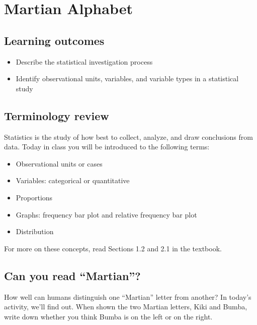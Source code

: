 \documentclass[
]{report}
\begin{document}
\hypertarget{martian-alphabet}{%
\chapter{Martian Alphabet}\label{martian-alphabet}}

\hypertarget{learning-outcomes}{%
\section{Learning outcomes}\label{learning-outcomes}}

\begin{itemize}
\item
  Describe the statistical investigation process
\item
  Identify observational units, variables, and variable types in a statistical study
\end{itemize}

\hypertarget{terminology-review}{%
\section{Terminology review}\label{terminology-review}}

Statistics is the study of how best to collect, analyze, and draw conclusions from data. Today in class you will be introduced to the following terms:

\begin{itemize}
\item
  Observational units or cases
\item
  Variables: categorical or quantitative
\item
  Proportions
\item
  Graphs: frequency bar plot and relative frequency bar plot
\item
  Distribution
\end{itemize}

For more on these concepts, read Sections 1.2 and 2.1 in the textbook.

\hypertarget{can-you-read-martian}{%
\section{Can you read ``Martian''?}\label{can-you-read-martian}}

How well can humans distinguish one ``Martian'' letter from another? In today's activity, we'll find out. When shown the two Martian letters, Kiki and Bumba, write down whether you think Bumba is on the left or on the right.
\vspace{2mm}
\end{document}
